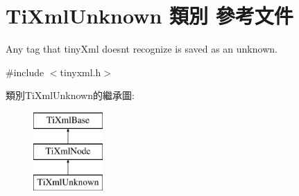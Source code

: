 \hypertarget{class_ti_xml_unknown}{}\section{Ti\+Xml\+Unknown 類別 參考文件}
\label{class_ti_xml_unknown}


Any tag that tiny\+Xml doesn\textquotesingle{}t recognize is saved as an unknown.  




{\ttfamily \#include $<$tinyxml.\+h$>$}

類別\+Ti\+Xml\+Unknown的繼承圖\+:\begin{figure}[H]
\begin{center}
\leavevmode
\includegraphics[height=3.000000cm]{class_ti_xml_unknown}
\end{center}
\end{figure}
